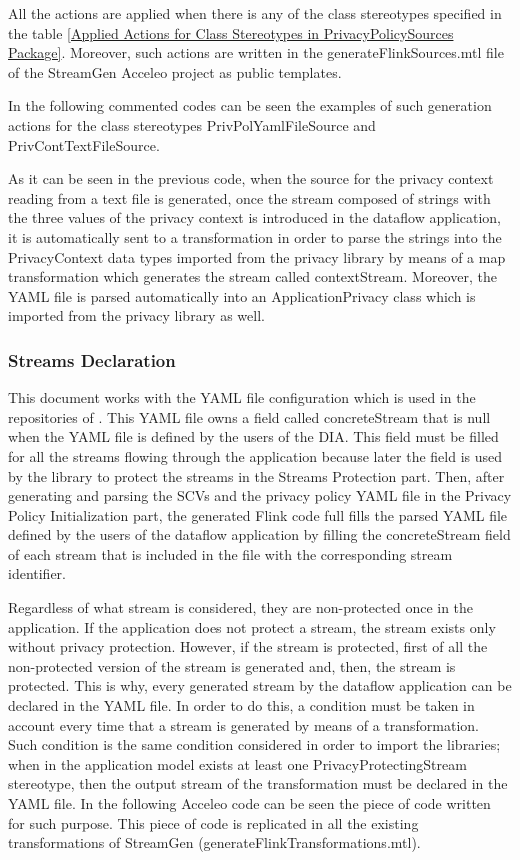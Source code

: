 All the actions are applied when there is any of the class stereotypes specified in the table \ref{Applied Actions for Class Stereotypes in PrivacyPolicySources Package}. Moreover, such actions are written in the generateFlinkSources.mtl file of the StreamGen Acceleo project as public templates.

In the following commented codes can be seen the examples of such generation actions for the class stereotypes PrivPolYamlFileSource and PrivContTextFileSource.



As it can be seen in the previous code, when the source for the privacy context reading from a text file is generated, once the stream composed of strings with the three values of the privacy context is introduced in the dataflow application, it is automatically sent to a transformation in order to parse the strings into the PrivacyContext data types imported from the privacy library by means of a map transformation which generates the stream called contextStream. Moreover, the YAML file is parsed automatically into an ApplicationPrivacy class which is imported from the privacy library as well.

\subsubsection{Streams Declaration}

This document works with the YAML file configuration which is used in the repositories of \cite{privacypoliciesarticle}. This YAML file owns a field called concreteStream that is null when the YAML file is defined by the users of the DIA. This field must be filled for all the streams flowing through the application because later the field is used by the library to protect the streams in the Streams Protection part. Then, after generating and parsing the SCVs and the privacy policy YAML file in the Privacy Policy Initialization part, the generated Flink code full fills the parsed YAML file defined by the users of the dataflow application by filling the concreteStream field of each stream that is included in the file with the corresponding stream identifier.

Regardless of what stream is considered, they are non-protected once in the application. If the application does not protect a stream, the stream exists only without privacy protection. However, if the stream is protected, first of all the non-protected version of the stream is generated and, then, the stream is protected. This is why, every generated stream by the dataflow application can be declared in the YAML file. In order to do this, a condition must be taken in account every time that a stream is generated by means of a transformation. Such condition is the same condition considered in order to import the libraries; when in the application model exists at least one PrivacyProtectingStream stereotype, then the output stream of the transformation must be declared in the YAML file. In the following Acceleo code can be seen the piece of code written for such purpose. This piece of code is replicated in all the existing transformations of StreamGen (generateFlinkTransformations.mtl).

